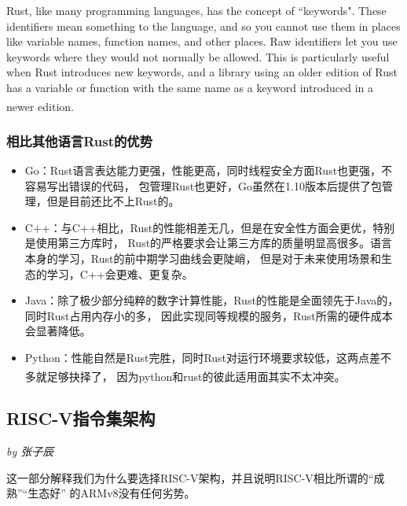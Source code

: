 \documentclass[UTF8,fontset=none,linespread=1.15]{ctexart}
\let\nosupcite\cite
\renewcommand*{\cite}[1]{\textsuperscript{\nosupcite{#1}}}
\newcommand{\sectionauthor}[1]{%
\vspace*{-5ex}
\noindent\textrm{\hfill\textit{by #1}}
\vspace*{2ex}\par}
\begin{document}
Rust, like many programming languages, has the concept of ``keywords". These
identifiers mean something to the language, and so you cannot use them in places
like variable names, function names, and other places. Raw identifiers let you use
keywords where they would not normally be allowed. This is particularly useful
when Rust introduces new keywords, and a library using an older edition of Rust
has a variable or function with the same name as a keyword introduced in a newer edition.\cite{bib:8-rust-compatibility}

\subsubsection{相比其他语言Rust的优势}

\begin{itemize}
\item Go：Rust语言表达能力更强，性能更高，同时线程安全方面Rust也更强，不容易写出错误的代码，
包管理Rust也更好，Go虽然在1.10版本后提供了包管理，但是目前还比不上Rust的。
\item C++：与C++相比，Rust的性能相差无几，但是在安全性方面会更优，特别是使用第三方库时，
Rust的严格要求会让第三方库的质量明显高很多。语言本身的学习，Rust的前中期学习曲线会更陡峭，
但是对于未来使用场景和生态的学习，C++会更难、更复杂。
\item Java：除了极少部分纯粹的数字计算性能，Rust的性能是全面领先于Java的，同时Rust占用内存小的多，
因此实现同等规模的服务，Rust所需的硬件成本会显著降低。
\item Python：性能自然是Rust完胜，同时Rust对运行环境要求较低，这两点差不多就足够抉择了，
因为python和rust的彼此适用面其实不太冲突。\cite{bib:5-why-rust2}
\end{itemize}

\subsection{RISC-V指令集架构}\sectionauthor{张子辰}
这一部分解释我们为什么要选择RISC-V架构，并且说明RISC-V相比所谓的“成熟”“生态好”
的ARMv8没有任何劣势。
\end{document}
